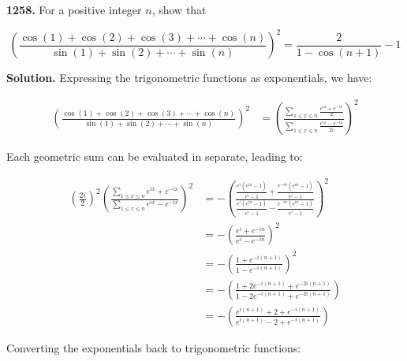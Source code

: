 \documentclass{letter}
\begin{document}
\newtheorem{lemma}{Lemma}

\begin{letter}{}

\textbf{1258.} For a positive integer $n$, show that

  $$ \left(\frac{
    \cos(1)+\cos(2)+\cos(3)+\cdots+\cos(n)
  }{
    \sin(1)+\sin(2)+\cdots+\sin(n)
  }\right)^2=\frac{2}{1-\cos\left(n+1\right)}-1$$
    
  \textbf{Solution.} Expressing the trigonometric functions as exponentials, we have:

  \begin{align*}
    \left(\frac{
      \cos(1)+\cos(2)+\cos(3)+\cdots+\cos(n)
    }{
      \sin(1)+\sin(2)+\cdots+\sin(n)
    }\right)^2 &=
    \left(\frac{\displaystyle\sum_{1\le x\le n}\frac{e^{i x}+e^{-i x}}{2}}
    {\displaystyle\sum_{1\le x\le n}\frac{e^{i x}-e^{-i x}}{2i}}\right)^2
  \end{align*}

  Each geometric sum can be evaluated in separate, leading to:

  \begin{align*}
    \left(\frac{2i}{2}\right)^2\left(\frac{\displaystyle\sum_{1\le x\le n}e^{i x}+e^{-i x}}
    {\displaystyle\sum_{1\le x\le n}e^{i x}-e^{-i x}}\right)^2
    &=
    -\left(\displaystyle\frac{
        \displaystyle\frac{e^i\left(e^{i n}-1\right) }{e^i-1}+
        \displaystyle\frac{e^{-i n}\left( e^{in}-1\right)}{e^{i}-1}
    }{
        \displaystyle\frac{e^i\left(e^{i n}-1\right) }{e^i-1}-
        \displaystyle\frac{e^{-i n}\left( e^{in}-1\right)}{e^{i}-1}
    }\right)^2 \\
    &=
    -\left(\displaystyle\frac{
      e^i
      +e^{-i n}
    }{
      e^i
      -e^{-i n}
    }
    \right)^2 \\
    &=
    -\left(\displaystyle\frac{
      1
      +e^{-i (n+1)}
    }{
      1
      -e^{-i (n+1)}
    }
    \right)^2 \\
    &=
    -\left(\displaystyle\frac{
      1
      +2e^{-i (n+1)}
      +e^{-2i (n+1)}
    }{
      1
      -2e^{-i (n+1)}
      +e^{-2i (n+1)}
    }
    \right)\\
    &=
    -\left(\displaystyle\frac{
      e^{i(n+1)}
      +2
      +e^{-i (n+1)}
    }{
      e^{i(n+1)}
      -2
      +e^{-i (n+1)}
    }
    \right)
  \end{align*}

  Converting the exponentials back to trigonometric functions:


\end{letter}
\end{document}

